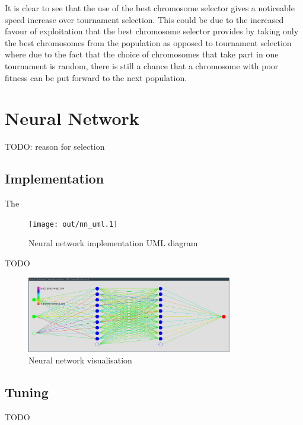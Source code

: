 \documentclass[a4paper]{article}
\begin{document}
It is clear to see that the use of the best chromosome selector gives a
noticeable speed increase over tournament selection. This could be due to the
increased favour of exploitation that the best chromosome selector provides by
taking only the best chromosomes from the population as opposed to tournament
selection where due to the fact that the choice of chromosomes that take part in
one tournament is random, there is still a chance that a chromosome with poor
fitness can be put forward to the next population.

\section{Neural Network}
\label{sec:nn}

TODO: reason for selection

\subsection{Implementation}
\label{sec:nn_implementation}

The

\begin{figure}[h!]
  \centering
  \texttt{[image: out/nn\_uml.1]}
  \caption{Neural network implementation UML diagram}
  \label{fig:nn_uml}
\end{figure}

TODO

\begin{figure}[h!]
  \centering
  \includegraphics[width=0.8\textwidth]{graphics/nn_vis.eps}
  \caption{Neural network visualisation}
  \label{fig:nn_vis}
\end{figure}

\subsection{Tuning}
\label{sec:nn_tuning}

TODO
\end{document}
